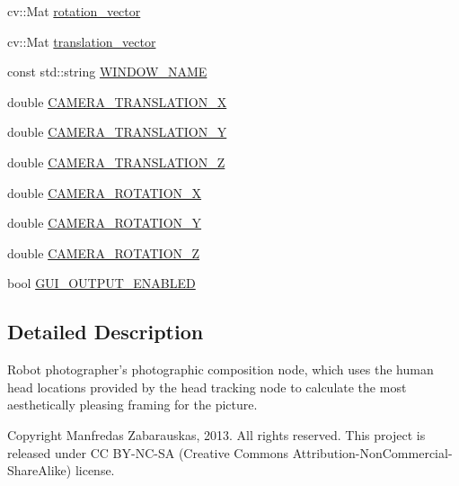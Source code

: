 \begin{DoxyCompactItemize}
\item 
cv\-::\-Mat \hyperlink{class_r_p_framing_node_a118f00fa5a583971493536d0374a1a80}{rotation\-\_\-vector}
\item 
cv\-::\-Mat \hyperlink{class_r_p_framing_node_a69f636be3f1cc2793e48596a1da71909}{translation\-\_\-vector}
\item 
const std\-::string \hyperlink{class_r_p_framing_node_a144c66f7dcab4a463222f44d48128a5d}{\-W\-I\-N\-D\-O\-W\-\_\-\-N\-A\-M\-E}
\item 
double \hyperlink{class_r_p_framing_node_a583866e6d7361f07a7fdd5e0d357b251}{\-C\-A\-M\-E\-R\-A\-\_\-\-T\-R\-A\-N\-S\-L\-A\-T\-I\-O\-N\-\_\-\-X}
\item 
double \hyperlink{class_r_p_framing_node_a64ee86907af0fccc401e72fcbfac8df4}{\-C\-A\-M\-E\-R\-A\-\_\-\-T\-R\-A\-N\-S\-L\-A\-T\-I\-O\-N\-\_\-\-Y}
\item 
double \hyperlink{class_r_p_framing_node_a6b93f87ce0907cf58a5d24456ab9ccb4}{\-C\-A\-M\-E\-R\-A\-\_\-\-T\-R\-A\-N\-S\-L\-A\-T\-I\-O\-N\-\_\-\-Z}
\item 
double \hyperlink{class_r_p_framing_node_a66f21072e0ca3190decc590933a83cdb}{\-C\-A\-M\-E\-R\-A\-\_\-\-R\-O\-T\-A\-T\-I\-O\-N\-\_\-\-X}
\item 
double \hyperlink{class_r_p_framing_node_a9aad5136e8873e8b15012db9e2b56ec6}{\-C\-A\-M\-E\-R\-A\-\_\-\-R\-O\-T\-A\-T\-I\-O\-N\-\_\-\-Y}
\item 
double \hyperlink{class_r_p_framing_node_a2f7f848008e9c555f17fc418c65c0fb1}{\-C\-A\-M\-E\-R\-A\-\_\-\-R\-O\-T\-A\-T\-I\-O\-N\-\_\-\-Z}
\item 
bool \hyperlink{class_r_p_framing_node_a8c5a4411117ae10fe4ff69c0fa3fb465}{\-G\-U\-I\-\_\-\-O\-U\-T\-P\-U\-T\-\_\-\-E\-N\-A\-B\-L\-E\-D}
\end{DoxyCompactItemize}


\subsection{\-Detailed \-Description}
\-Robot photographer's photographic composition node, which uses the human head locations provided by the head tracking node to calculate the most aesthetically pleasing framing for the picture. 

\begin{DoxyCopyright}{\-Copyright}
\-Manfredas \-Zabarauskas, 2013. \-All rights reserved. \-This project is released under \-C\-C \-B\-Y-\/\-N\-C-\/\-S\-A (\-Creative \-Commons \-Attribution-\/\-Non\-Commercial-\/\-Share\-Alike) license. 
\end{DoxyCopyright}


